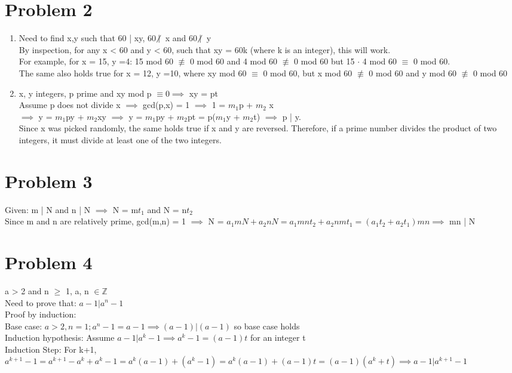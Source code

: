 \documentclass[english]{article}
\newcommand{\ndiv}{\hspace{-4pt}\not|\hspace{2pt}}
\begin{document}
\section*{Problem 2}
\begin{enumerate} [label=\alph*]
\item Need to find x,y such that 60 | xy, 60 $\ndiv$ x and 60 $\ndiv$ y \\ By inspection, for any x < 60 and y < 60, such that xy = 60k (where k is an integer), this will work. \\ For example, for x = 15, y =4: 15 mod 60 $\not \equiv$ 0 mod 60 and 4 mod 60 $\not \equiv$ 0 mod 60 but 15 $\cdot$ 4 mod 60 $\equiv$ 0 mod 60. \\
The same also holds true for x = 12, y =10, where xy mod 60 $\equiv$ 0 mod 60, but x mod 60 $\not \equiv$ 0 mod 60 and y mod 60 $\not \equiv$ 0 mod 60
\item x, y integers, p prime and xy mod p $\equiv 0 \implies$ xy = pt \\
Assume p does not divide x $\implies$ gcd(p,x) = 1 $\implies$ 1 = $m_1$p + $m_2$ x \\
$\implies$ y = $m_1$py + $m_2$xy $\implies$ y = $m_1$py + $m_2$pt = p($m_1$y + $m_2$t) $\implies$
p | y. \\Since x was picked randomly, the same holds true if x and y are reversed. Therefore, if a prime number divides the product of two integers, it must divide at least one of the two integers.
\end{enumerate}
\section*{Problem 3}
Given: m | N and n | N $\implies$ N = m$t_1$ and N = n$t_2$ \\ Since m and n are relatively prime,
gcd(m,n) = 1 $\implies$ N = $a_1 m N + a_2 n N = a_1 m n t_2 + a_2 n m t_1 = (a_1 t_2 + a_2 t_1) mn \implies$ mn | N
\section*{Problem 4}
a > 2 and n $\geq$ 1, a, n $\in \mathbb{Z}$ \\
Need to prove that: $a - 1 | a^n - 1$ \\
Proof by induction:\\
Base case: $a > 2, n = 1; a^n - 1 =a - 1 \implies (a-1)|(a-1)$ so base case holds\\
Induction hypothesis: Assume $a - 1|a^k - 1 \implies a^k -1 = (a - 1)t$ for an integer t \\
Induction Step: For k+1, $ a^{k+1} - 1 = a^{k+1} - a^k + a^k -1 = a^k (a - 1) + (a^k -1) = a^k (a-1) + (a-1)t = (a-1)(a^k +t ) \implies a - 1 | a^{k+1} - 1$
\end{document}
